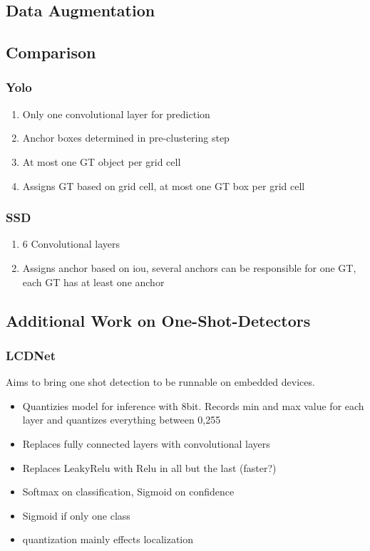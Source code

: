 \documentclass{article}
\begin{document}
	\subsection{Data Augmentation}
	
	\subsection{Comparison}
	\subsubsection{Yolo}
	\begin{enumerate}
		\item Only one convolutional layer for prediction
		\item Anchor boxes determined in pre-clustering step
		\item At most one GT object per grid cell
		\item Assigns GT based on grid cell, at most one GT box per grid cell
	\end{enumerate}
	\subsubsection{SSD}
	\begin{enumerate}
		\item 6 Convolutional layers
		\item Assigns anchor based on iou, several anchors can be responsible for one GT, each GT has at least one anchor
	\end{enumerate}
	
	\subsection{Additional Work on One-Shot-Detectors}
	
	\subsubsection{LCDNet\cite{TripathiSanDiego}}
	
	Aims to bring one shot detection to be runnable on embedded devices.
	
	\begin{itemize}
		\item Quantizies model for inference with 8bit. Records min and max value for each layer and quantizes everything between 0,255
		\item Replaces fully connected layers with convolutional layers
		\item Replaces LeakyRelu with Relu in all but the last (faster?)
		\item Softmax on classification, Sigmoid on confidence
		\item Sigmoid if only one class
		\item quantization mainly effects localization
	\end{itemize}
	
\end{document}
